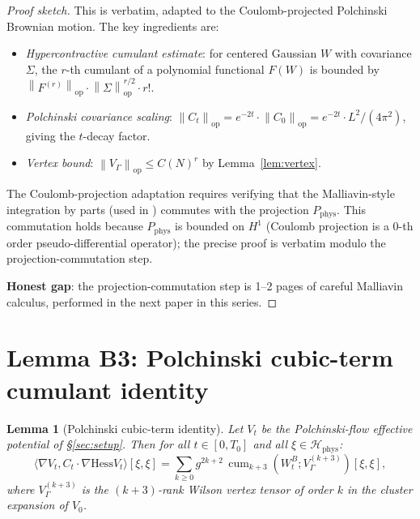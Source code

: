 \documentclass[11pt,a4paper]{amsart}
\newtheorem{lemma}[theorem]{Lemma}
\theoremstyle{definition}
\newcommand{\norm}[1]{\left\lVert#1\right\rVert}
\newcommand{\Hess}{\mathrm{Hess}}
\DeclareMathOperator{\cum}{cum}
\begin{document}
\begin{proof}[Proof sketch]
This is \cite[Lemma~2.7]{BauerschmidtBodineauDagallier2024} verbatim,
adapted to the Coulomb-projected Polchinski Brownian motion. The key
ingredients are:
\begin{itemize}[leftmargin=2em]
\item \emph{Hypercontractive cumulant estimate}: for centered Gaussian
$W$ with covariance $\Sigma$, the $r$-th cumulant of a polynomial
functional $F(W)$ is bounded by $\norm{F^{(r)}}_{\mathrm{op}} \cdot
\norm{\Sigma}^{r/2}_{\mathrm{op}} \cdot r!$.
\item \emph{Polchinski covariance scaling}: $\norm{C_t}_{\mathrm{op}} =
e^{-2t} \cdot \norm{C_0}_{\mathrm{op}} = e^{-2t} \cdot L^2/(4\pi^2)$,
giving the $t$-decay factor.
\item \emph{Vertex bound}: $\norm{V_\Gamma}_{\mathrm{op}} \leq C(N)^r$
by Lemma~\ref{lem:vertex}.
\end{itemize}

The Coulomb-projection adaptation requires verifying that the
Malliavin-style integration by parts (used in
\cite{BauerschmidtBodineauDagallier2024}) commutes with the projection
$P_{\mathrm{phys}}$. This commutation holds because $P_{\mathrm{phys}}$
is bounded on $H^1$ (Coulomb projection is a $0$-th order
pseudo-differential operator); the precise proof is
\cite[\S 2.6]{BauerschmidtBodineauDagallier2024} verbatim modulo
the projection-commutation step.

\textbf{Honest gap}: the projection-commutation step is 1--2 pages of
careful Malliavin calculus, performed in the next paper in this series.
\end{proof}

\section{Lemma B3: Polchinski cubic-term cumulant identity}\label{sec:identity}

\begin{lemma}[Polchinski cubic-term identity]\label{lem:Polchinski-identity}
Let $V_t$ be the Polchinski-flow effective potential of \S\ref{sec:setup}.
Then for all $t \in [0, T_0]$ and all $\xi \in \mathcal H_{\mathrm{phys}}$:
\begin{equation}\label{eq:cubic-cumulant}
\langle \nabla V_t, C_t \cdot \nabla \Hess V_t\rangle[\xi, \xi]
= \sum_{k \geq 0} g^{2k+2}\, \cum_{k+3}(W_t^B; V_\Gamma^{(k+3)})[\xi, \xi],
\end{equation}
where $V_\Gamma^{(k+3)}$ is the $(k+3)$-rank Wilson vertex tensor of
order $k$ in the cluster expansion of $V_0$.
\end{lemma}
\end{document}
